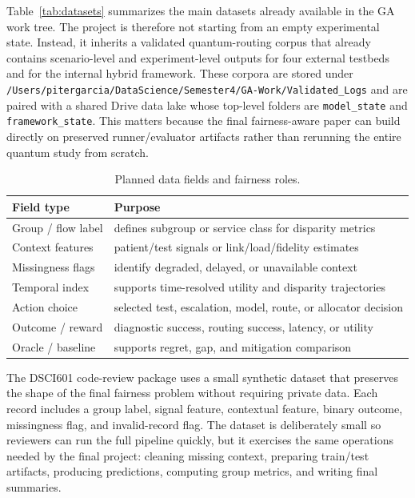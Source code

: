 \documentclass[conference]{IEEEtran}
\begin{document}
Table~\ref{tab:datasets} summarizes the main datasets already available in the
GA work tree. The project is therefore not starting from an empty experimental
state. Instead, it inherits a validated quantum-routing corpus that already
contains scenario-level and experiment-level outputs for four external testbeds
and for the internal hybrid framework. These corpora are stored under
\texttt{/Users/pitergarcia/DataScience/Semester4/GA-Work/Validated\_Logs} and
are paired with a shared Drive data lake whose top-level folders are
\texttt{model\_state} and \texttt{framework\_state}. This matters because the
final fairness-aware paper can build directly on preserved runner/evaluator
artifacts rather than rerunning the entire quantum study from scratch.

\begin{table}[t]
\caption{Planned data fields and fairness roles.}
\label{tab:data_fields}
\centering
\small
\begin{tabular}{p{}p{}}
\toprule
\textbf{Field type} & \textbf{Purpose} \\
\midrule
Group / flow label & defines subgroup or service class for disparity metrics \\
Context features & patient/test signals or link/load/fidelity estimates \\
Missingness flags & identify degraded, delayed, or unavailable context \\
Temporal index & supports time-resolved utility and disparity trajectories \\
Action choice & selected test, escalation, model, route, or allocator decision \\
Outcome / reward & diagnostic success, routing success, latency, or utility \\
Oracle / baseline & supports regret, gap, and mitigation comparison \\
\bottomrule
\end{tabular}
\end{table}

The DSCI601 code-review package uses a small synthetic dataset that preserves
the shape of the final fairness problem without requiring private data. Each
record includes a group label, signal feature, contextual feature, binary
outcome, missingness flag, and invalid-record flag. The dataset is deliberately
small so reviewers can run the full pipeline quickly, but it exercises the
same operations needed by the final project: cleaning missing context,
preparing train/test artifacts, producing predictions, computing group
metrics, and writing final summaries.
\end{document}

